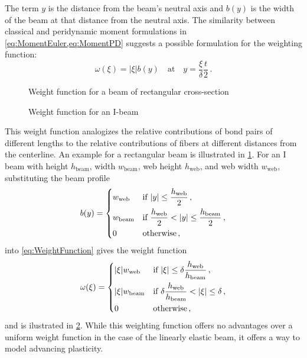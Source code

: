 %
The term \(y\) is the distance from the beam's neutral axis and \(b(y)\) is the width of the beam at that distance from the neutral axis. 
The similarity between classical and peridynamic moment formulations in \cref{eq:MomentEuler,eq:MomentPD} suggests a possible formulation for the weighting function:
%
\begin{equation}
\label{eq:WeightFunction}
\omega(\xi) = |\xi| b\left(y\right) \quad \text{at} \quad y=\frac{\xi}{\delta} \frac{t}{2}\, .
\end{equation}
%
\begin{figure}[h]
 \centering
\caption{Weight function for a beam of rectangular cross-section}
\label{fig:WeightProfileUniform}
\end{figure}

\begin{figure}
  \centering
\caption{Weight function for an I-beam}
\label{fig:WeightProfileIbeam}
\end{figure}
%
This weight function analogizes the relative contributions of bond pairs of different lengths to the relative contributions of fibers at different distances from the centerline. 
An example for a rectangular beam is illustrated in \cref{fig:WeightProfileUniform}.
For an I beam with height \(h_\text{beam}\), width \(w_\text{beam}\), web height \(h_\text{web}\), and web width \(w_\text{web}\), substituting the beam profile
\begin{equation}
b(y) = 
  \begin{dcases}
    w_\text{web} & \text{if } |y| \leq \frac{h_\text{web}}{2}\, , \\
    w_\text{beam} & \text{if } \frac{h_\text{web}}{2} < |y| \leq \frac{h_\text{beam}}{2}\, , \\
    0 &\text{otherwise}\,,
  \end{dcases}\notag
\end{equation}
into \cref{eq:WeightFunction} gives the weight function
\begin{equation}
\omega(\xi) = 
  \begin{dcases}
    |\xi| w_\text{web}& \text{if } |\xi| \leq \delta\frac{h_\text{web}}{h_\text{beam}}\, , \\
    |\xi| w_\text{beam} & \text{if } \delta\frac{h_\text{web}}{h_\text{beam}} < |\xi| \leq \delta\, , \\
    0 &\text{otherwise}\,,
  \end{dcases}\notag
\end{equation}
and is ilustrated in \cref{fig:WeightProfileIbeam}.
    While this weighting function offers no advantages over a uniform weight function in the case of the linearly elastic beam, it offers a way to model advancing plasticity.

